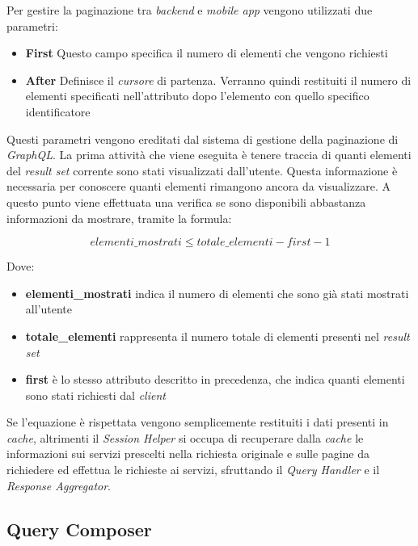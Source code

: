 Per gestire la paginazione tra \emph{backend} e \emph{mobile app} vengono utilizzati due parametri:

\begin{itemize}
	\item \textbf{First}
	Questo campo specifica il numero di elementi che vengono richiesti
	\item \textbf{After}
	Definisce il \emph{cursore} di partenza. Verranno quindi restituiti il numero di elementi specificati nell'attributo  dopo l'elemento con quello specifico identificatore
\end{itemize}

Questi parametri vengono ereditati dal sistema di gestione della paginazione di \emph{GraphQL}. La prima attività che viene eseguita è tenere traccia di quanti elementi del \emph{result set} corrente sono stati visualizzati dall'utente. Questa informazione è necessaria per conoscere quanti elementi rimangono ancora da visualizzare. A questo punto viene effettuata una verifica se sono disponibili abbastanza informazioni da mostrare, tramite la formula:

\begin{equation}
	elementi\_mostrati \le totale\_elementi - first - 1
\end{equation}

Dove:

\begin{itemize}
	\item \textbf{elementi\_mostrati}
	indica il numero di elementi che sono già stati mostrati all'utente
	\item \textbf{totale\_elementi}
	rappresenta il numero totale di elementi presenti nel \emph{result set}
	\item \textbf{first}
	è lo stesso attributo descritto in precedenza, che indica quanti elementi sono stati richiesti dal \emph{client}
\end{itemize}

Se l'equazione è rispettata vengono semplicemente restituiti i dati presenti in \emph{cache}, altrimenti il \emph{Session Helper} si occupa di recuperare dalla \emph{cache} le informazioni sui servizi prescelti nella richiesta originale e sulle pagine da richiedere ed effettua le richieste ai servizi, sfruttando il \emph{Query Handler} e il \emph{Response Aggregator}.

\subsection{Query Composer\label{sec:query-composer}}


